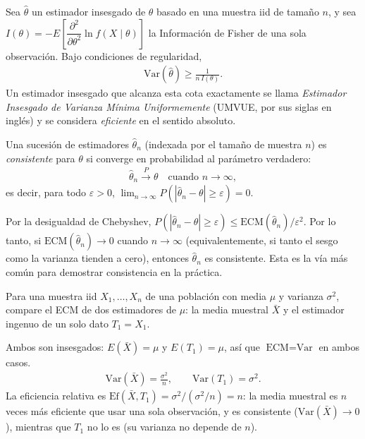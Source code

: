 \begin{teorema}
 \label{eq:6.1.5}
Sea $\hat{\theta}$ un estimador insesgado de $\theta$ basado en una muestra iid de tamaño $n$, y sea $I(\theta) = -E\left[\dfrac{\partial^2}{\partial\theta^2}\ln f(X\mid\theta)\right]$ la Información de Fisher de una sola observación. Bajo condiciones de regularidad,
\begin{align}
 \text{Var}(\hat{\theta}) \geq \frac{1}{n\,I(\theta)}.
\end{align}
Un estimador insesgado que alcanza esta cota exactamente se llama \emph{Estimador Insesgado de Varianza Mínima Uniformemente} (UMVUE, por sus siglas en inglés) y se considera \emph{eficiente} en el sentido absoluto.
\end{teorema}

\begin{definicion}[Consistencia]
 \label{eq:6.1.6}
Una sucesión de estimadores $\hat{\theta}_n$ (indexada por el tamaño de muestra $n$) es \emph{consistente} para $\theta$ si converge en probabilidad al parámetro verdadero:
\begin{align}
 \hat{\theta}_n \xrightarrow{P} \theta \quad \text{cuando } n \to \infty,
\end{align}
es decir, para todo $\varepsilon > 0$, $\lim_{n\to\infty} P(|\hat{\theta}_n - \theta| \geq \varepsilon) = 0$.
\end{definicion}

\begin{observacion}
Por la desigualdad de Chebyshev, $P(|\hat{\theta}_n-\theta|\ge\varepsilon) \le \text{ECM}(\hat{\theta}_n)/\varepsilon^2$. Por lo tanto, si $\text{ECM}(\hat{\theta}_n) \to 0$ cuando $n\to\infty$ (equivalentemente, si tanto el sesgo como la varianza tienden a cero), entonces $\hat{\theta}_n$ es consistente. Esta es la vía más común para demostrar consistencia en la práctica.
\end{observacion}

\begin{ejemplo}
 \label{exmp:6.1.1}
Para una muestra iid $X_1,\ldots,X_n$ de una población con media $\mu$ y varianza $\sigma^2$, compare el ECM de dos estimadores de $\mu$: la media muestral $\bar{X}$ y el estimador ingenuo de un solo dato $T_1 = X_1$.
\end{ejemplo}

\begin{solucion}
Ambos son insesgados: $E(\bar{X})=\mu$ y $E(T_1)=\mu$, así que $\text{ECM}=\text{Var}$ en ambos casos.
\begin{align}
 \text{Var}(\bar{X}) = \frac{\sigma^2}{n}, \qquad \text{Var}(T_1) = \sigma^2.
\end{align}
La eficiencia relativa es $\text{Ef}(\bar{X}, T_1) = \sigma^2/(\sigma^2/n) = n$: la media muestral es $n$ veces más eficiente que usar una sola observación, y es consistente ($\text{Var}(\bar{X})\to 0$), mientras que $T_1$ no lo es (su varianza no depende de $n$).
\end{solucion}

